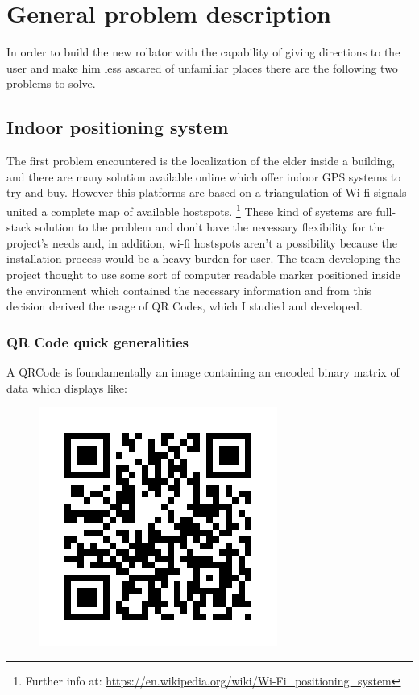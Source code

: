 \chapter{General problem description}

In order to build the new rollator with the capability of giving directions to
the user and make him less ascared of unfamiliar places there are the following
two problems to solve.

\section{Indoor positioning system}
The first problem encountered is the localization of the elder inside a
building, and there are many solution available online which offer indoor 
GPS systems to try and buy.
However this platforms are based on a triangulation of Wi-fi signals united a
complete map of available hostspots.
\footnote{Further info at: 
\url{https://en.wikipedia.org/wiki/Wi-Fi_positioning_system}}
These kind of systems are full-stack solution to the problem and don't have the
necessary flexibility for the project's needs and, in addition, wi-fi hostspots 
aren't a possibility because the installation process would be a heavy burden
for user.
\newline
The team developing the project thought to use some sort of computer readable 
marker positioned inside the environment which contained the necessary information
and from this decision derived the usage of QR Codes, which I studied and
developed.

\newpage
\subsection{QR Code quick generalities}
A QRCode is foundamentally an image containing an encoded binary matrix of data which displays like:
\begin{figure}[hbt]
    \centering
    \includegraphics[scale=0.5]{img/qr.png}
\end{figure}

